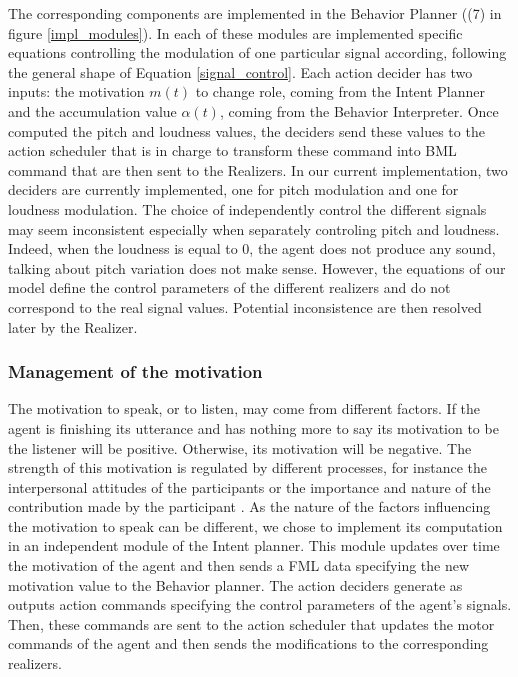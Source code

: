 The corresponding components are implemented in the Behavior Planner ((7) in figure \ref{impl_modules}). In each of these modules are implemented specific equations controlling the modulation of one particular signal according, following the general shape of Equation \ref{signal_control}. Each action decider has two inputs: the motivation $m(t)$ to change role, coming from the Intent Planner and the accumulation value $\alpha(t)$, coming from the Behavior Interpreter. 
Once computed the pitch and loudness values, the deciders send these values to the action scheduler that is in charge to transform these command into BML command that are then sent to the Realizers. 
In our current implementation, two deciders are currently implemented, one for pitch modulation and one for loudness modulation. 
The choice of independently control the different signals may seem inconsistent especially when separately controling pitch and loudness. Indeed, when the loudness is equal to $0$, the agent does not produce any sound, talking about pitch variation does not make sense. However, the equations of our model define the control parameters of the different realizers and do not correspond to the real signal values. Potential inconsistence are then resolved later by the Realizer.  


\subsubsection{Management of the motivation}

The motivation to speak, or to listen, may come from different factors. If the agent is finishing its utterance and has nothing more to say its motivation to be the listener will be positive. Otherwise, its motivation will be negative. The strength of this motivation is regulated by different processes, for instance the interpersonal attitudes of the participants \citep{ter_maat_how_2010,ravenet_conversational_2015} or the importance and nature of the contribution made by the participant \citep{cafaro_effects_2016}. As the nature of the factors influencing the motivation to speak can be different, we chose to implement its computation in an independent module of the Intent planner. This module updates over time the motivation of the agent and then sends a FML data specifying the new motivation value to the Behavior planner. 
The action deciders generate as outputs action commands specifying the control parameters of the agent's signals. Then, these commands are sent to the action scheduler that updates the motor commands of the agent and then sends the modifications to the corresponding realizers.


